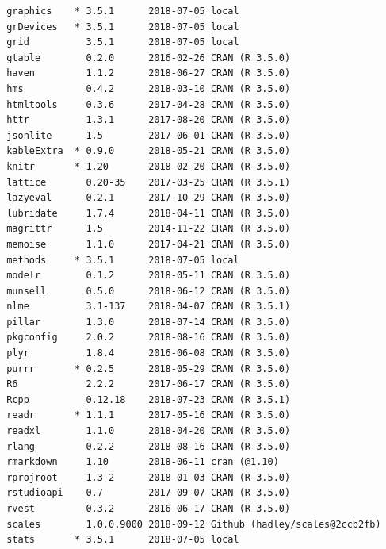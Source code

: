 \documentclass[proquest,12pt,final]{ucthesis-CA2012} %
\begin{document}
\begin{ucmainmatter}
\begin{verbatim}
 graphics    * 3.5.1      2018-07-05 local                                
 grDevices   * 3.5.1      2018-07-05 local                                
 grid          3.5.1      2018-07-05 local                                
 gtable        0.2.0      2016-02-26 CRAN (R 3.5.0)                       
 haven         1.1.2      2018-06-27 CRAN (R 3.5.0)                       
 hms           0.4.2      2018-03-10 CRAN (R 3.5.0)                       
 htmltools     0.3.6      2017-04-28 CRAN (R 3.5.0)                       
 httr          1.3.1      2017-08-20 CRAN (R 3.5.0)                       
 jsonlite      1.5        2017-06-01 CRAN (R 3.5.0)                       
 kableExtra  * 0.9.0      2018-05-21 CRAN (R 3.5.0)                       
 knitr       * 1.20       2018-02-20 CRAN (R 3.5.0)                       
 lattice       0.20-35    2017-03-25 CRAN (R 3.5.1)                       
 lazyeval      0.2.1      2017-10-29 CRAN (R 3.5.0)                       
 lubridate     1.7.4      2018-04-11 CRAN (R 3.5.0)                       
 magrittr      1.5        2014-11-22 CRAN (R 3.5.0)                       
 memoise       1.1.0      2017-04-21 CRAN (R 3.5.0)                       
 methods     * 3.5.1      2018-07-05 local                                
 modelr        0.1.2      2018-05-11 CRAN (R 3.5.0)                       
 munsell       0.5.0      2018-06-12 CRAN (R 3.5.0)                       
 nlme          3.1-137    2018-04-07 CRAN (R 3.5.1)                       
 pillar        1.3.0      2018-07-14 CRAN (R 3.5.0)                       
 pkgconfig     2.0.2      2018-08-16 CRAN (R 3.5.0)                       
 plyr          1.8.4      2016-06-08 CRAN (R 3.5.0)                       
 purrr       * 0.2.5      2018-05-29 CRAN (R 3.5.0)                       
 R6            2.2.2      2017-06-17 CRAN (R 3.5.0)                       
 Rcpp          0.12.18    2018-07-23 CRAN (R 3.5.1)                       
 readr       * 1.1.1      2017-05-16 CRAN (R 3.5.0)                       
 readxl        1.1.0      2018-04-20 CRAN (R 3.5.0)                       
 rlang         0.2.2      2018-08-16 CRAN (R 3.5.0)                       
 rmarkdown     1.10       2018-06-11 cran (@1.10)                         
 rprojroot     1.3-2      2018-01-03 CRAN (R 3.5.0)                       
 rstudioapi    0.7        2017-09-07 CRAN (R 3.5.0)                       
 rvest         0.3.2      2016-06-17 CRAN (R 3.5.0)                       
 scales        1.0.0.9000 2018-09-12 Github (hadley/scales@2ccb2fb)       
 stats       * 3.5.1      2018-07-05 local                                

\end{verbatim}
\end{ucmainmatter}
\end{document}
